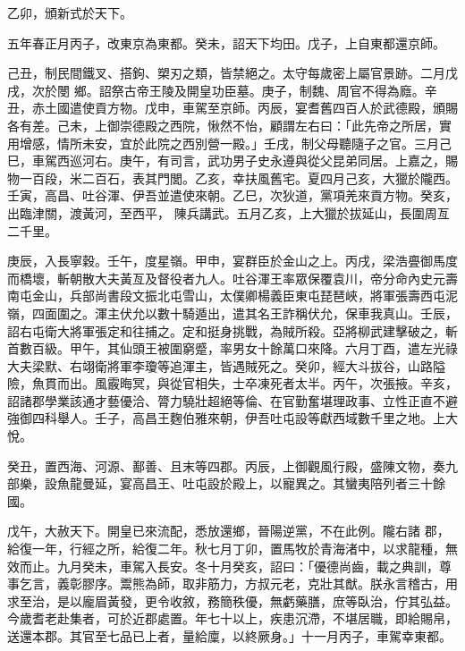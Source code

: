 \begin{pinyinscope}
 乙卯，頒新式於天下。



 五年春正月丙子，改東京為東都。癸未，詔天下均田。戊子，上自東都還京師。



 己丑，制民間鐵叉、搭鉤、槊刃之類，皆禁絕之。太守每歲密上屬官景跡。二月戊戌，次於閿
 鄉。詔祭古帝王陵及開皇功臣墓。庚子，制魏、周官不得為廕。辛丑，赤土國遣使貢方物。戊申，車駕至京師。丙辰，宴耆舊四百人於武德殿，頒賜各有差。己未，上御崇德殿之西院，愀然不怡，顧謂左右曰：「此先帝之所居，實用增感，情所未安，宜於此院之西別營一殿。」壬戌，制父母聽隨子之官。三月己巳，車駕西巡河右。庚午，有司言，武功男子史永遵與從父昆弟同居。上嘉之，賜物一百段，米二百石，表其門閭。乙亥，幸扶風舊宅。夏四月己亥，大獵於隴西。壬寅，高昌、吐谷渾、伊吾並遣使來朝。乙巳，次狄道，黨項羌來貢方物。癸亥，出臨津關，渡黃河，至西平，
 陳兵講武。五月乙亥，上大獵於拔延山，長圍周亙二千里。



 庚辰，入長寧穀。壬午，度星嶺。甲申，宴群臣於金山之上。丙戌，梁浩亹御馬度而橋壞，斬朝散大夫黃亙及督役者九人。吐谷渾王率眾保覆袁川，帝分命內史元壽南屯金山，兵部尚書段文振北屯雪山，太僕卿楊義臣東屯琵琶峽，將軍張壽西屯泥嶺，四面圍之。渾主伏允以數十騎遁出，遣其名王詐稱伏允，保車我真山。壬辰，詔右屯衛大將軍張定和往捕之。定和挺身挑戰，為賊所殺。亞將柳武建擊破之，斬首數百級。甲午，其仙頭王被圍窮蹙，率男女十餘萬口來降。六月丁酉，遣左光祿
 大夫梁默、右翊衛將軍李瓊等追渾主，皆遇賊死之。癸卯，經大斗拔谷，山路隘險，魚貫而出。風霰晦冥，與從官相失，士卒凍死者太半。丙午，次張掖。辛亥，詔諸郡學業該通才藝優洽、膂力驍壯超絕等倫、在官勤奮堪理政事、立性正直不避強御四科舉人。壬子，高昌王麴伯雅來朝，伊吾吐屯設等獻西域數千里之地。上大悅。



 癸丑，置西海、河源、鄯善、且末等四郡。丙辰，上御觀風行殿，盛陳文物，奏九部樂，設魚龍曼延，宴高昌王、吐屯設於殿上，以寵異之。其蠻夷陪列者三十餘國。



 戊午，大赦天下。開皇已來流配，悉放還鄉，晉陽逆黨，不在此例。隴右諸
 郡，給復一年，行經之所，給復二年。秋七月丁卯，置馬牧於青海渚中，以求龍種，無效而止。九月癸未，車駕入長安。冬十月癸亥，詔曰：「優德尚齒，載之典訓，尊事乞言，義彰膠序。鬻熊為師，取非筋力，方叔元老，克壯其猷。朕永言稽古，用求至治，是以龐眉黃發，更令收敘，務簡秩優，無虧藥膳，庶等臥治，佇其弘益。今歲耆老赴集者，可於近郡處置。年七十以上，疾患沉滯，不堪居職，即給賜帛，送還本郡。其官至七品已上者，量給廩，以終厥身。」十一月丙子，車駕幸東都。




\end{pinyinscope}
